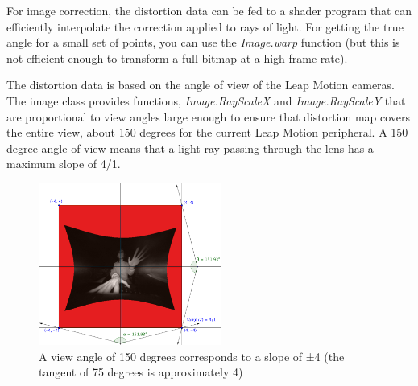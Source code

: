 \documentclass[journal]{IEEEtran}										    %
\begin{document}
                For image correction, the distortion data can be fed to a shader 
                program that can efficiently interpolate the correction applied to 
                rays of light. For getting the true angle for a small set of points, 
                you can use the \emph{Image.warp} function (but this is not efficient 
                enough to transform a full bitmap at a high frame rate).

                The distortion data is based on the angle of view of the Leap Motion 
                cameras. The image class provides functions, \emph{Image.RayScaleX} and 
                \emph{Image.RayScaleY} that are proportional to view angles large enough 
                to ensure that distortion map covers the entire view, about 150 degrees 
                for the current Leap Motion peripheral. A 150 degree angle of view means 
                that a light ray passing through the lens has a maximum slope of 4/1.

                \begin{figure}[h]
                    \centering
                    \includegraphics[width=6cm]{Leap-Image-Rays}
                    \caption{A view angle of 150 degrees corresponds to a slope of ±4 
                    (the tangent of 75 degrees is approximately 4)}
                    \label{fig:leapCam2}
                \end{figure}
\end{document}
